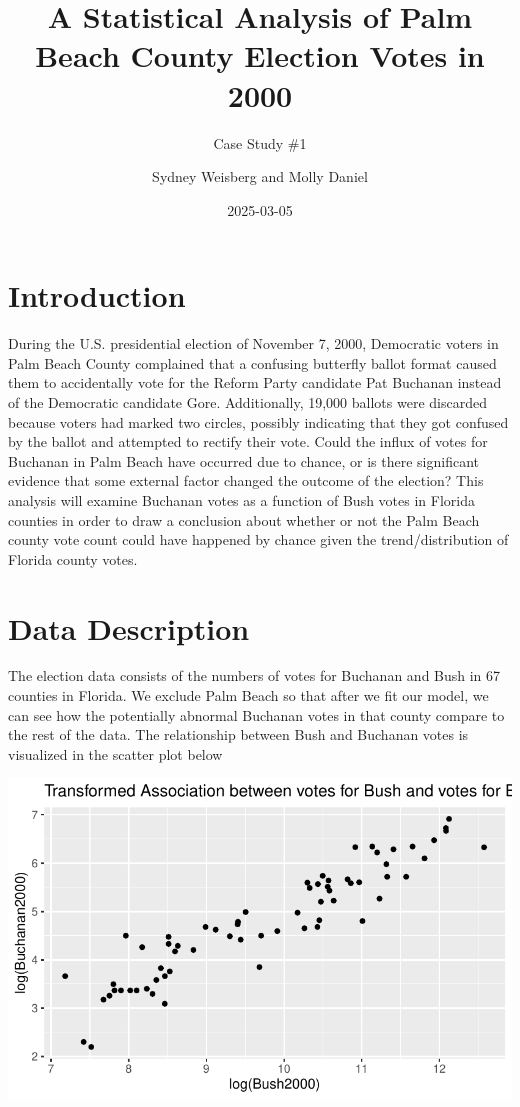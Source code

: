 \documentclass[
  letterpaper,
  DIV=11,
  numbers=noendperiod]{scrartcl}
\title{A Statistical Analysis of Palm Beach County Election Votes in
2000}
\subtitle{Case Study \#1}
\author{Sydney Weisberg and Molly Daniel}
\date{2025-03-05}
\begin{document}
\maketitle


\section{Introduction}\label{introduction}

During the U.S. presidential election of November 7, 2000, Democratic
voters in Palm Beach County complained that a confusing butterfly ballot
format caused them to accidentally vote for the Reform Party candidate
Pat Buchanan instead of the Democratic candidate Gore. Additionally,
19,000 ballots were discarded because voters had marked two circles,
possibly indicating that they got confused by the ballot and attempted
to rectify their vote. Could the influx of votes for Buchanan in Palm
Beach have occurred due to chance, or is there significant evidence that
some external factor changed the outcome of the election? This analysis
will examine Buchanan votes as a function of Bush votes in Florida
counties in order to draw a conclusion about whether or not the Palm
Beach county vote count could have happened by chance given the
trend/distribution of Florida county votes.

\section{Data Description}\label{data-description}

The election data consists of the numbers of votes for Buchanan and Bush
in 67 counties in Florida. We exclude Palm Beach so that after we fit
our model, we can see how the potentially abnormal Buchanan votes in
that county compare to the rest of the data. The relationship between
Bush and Buchanan votes is visualized in the scatter plot below

\includegraphics{case_study_1_files/figure-pdf/unnamed-chunk-2-1.pdf}
\end{document}
